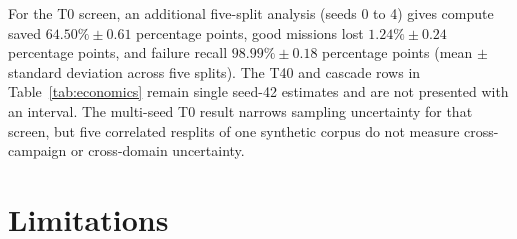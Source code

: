 \documentclass[preprint,12pt,authoryear]{elsarticle}
\begin{document}
For the T0 screen, an additional five-split analysis (seeds 0 to 4) gives compute saved $64.50\%\pm0.61$ percentage points, good missions lost $1.24\%\pm0.24$ percentage points, and failure recall $98.99\%\pm0.18$ percentage points (mean $\pm$ standard deviation across five splits). The T40 and cascade rows in Table~\ref{tab:economics} remain single seed-42 estimates and are not presented with an interval. The multi-seed T0 result narrows sampling uncertainty for that screen, but five correlated resplits of one synthetic corpus do not measure cross-campaign or cross-domain uncertainty.

\section{Limitations}
\label{sec:limitations}
\end{document}
